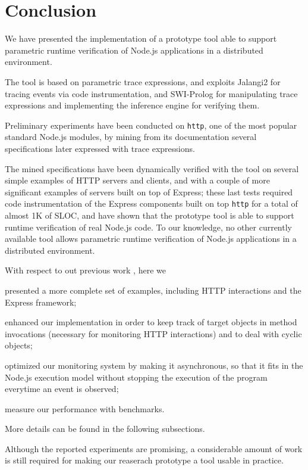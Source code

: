 \section{Conclusion}
\label{sec:conclu}

We have presented the implementation of a prototype tool able to support
parametric runtime verification of Node.js applications in a distributed environment.

The tool is based on parametric trace expressions, and exploits Jalangi2 for tracing events via code instrumentation, and SWI-Prolog for
manipulating trace expressions and implementing the inference engine for verifying them.

Preliminary experiments have been conducted on \lstinline{http}, one of the most popular standard Node.js modules,
by mining from its documentation several specifications later expressed with trace expressions.

The mined specifications have been dynamically verified with the tool on several simple examples of HTTP servers and clients,
and with a couple of more significant examples of servers built on top of Express; these last tests required code instrumentation of the Express components
built on top \lstinline{http} for a total of almost 1K of SLOC, and have shown that the prototype tool is able to support
runtime verification of real Node.js code.
To our knowledge, no other currently available tool allows parametric runtime verification of Node.js applications in a distributed environment.

With respect to out previous work \cite{TowardsIoT17}, here we
\begin{enumerate*}[label=(\alph*)]
	\item presented a more complete set of examples, including HTTP interactions and the Express framework;
	\item enhanced our implementation in order to keep track of target objects in method invocations (necessary for monitoring HTTP interactions) and to deal with cyclic objects;
	\item optimized our monitoring system by making it asynchronous, so that it fits in the Node.js execution model without stopping the execution of the program everytime an event is observed;
	\item measure our performance with benchmarks.
\end{enumerate*}
More details can be found in the following subsections.

Although the reported experiments are promising, a considerable amount of work is still required for making our reaserach prototype a
tool usable in practice.

